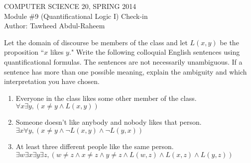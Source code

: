 \documentclass[12pt]{article}
\begin{document}
\begin{center}
COMPUTER SCIENCE 20, SPRING 2014 \\
Module \#9 (Quantificational Logic I) Check-in \\
Author: Tawheed Abdul-Raheem
\end{center}

\medskip


Let the domain of discourse be members of the class and let $L(x,y)$ be the proposition ``$x$ likes $y$." Write the following colloquial English sentences using quantificational formulas. The sentences are not necessarily unambiguous. If a sentence has more than one possible meaning, explain the ambiguity and which interpretation you have chosen.

\begin{enumerate}

\item Everyone in the class likes some other member of the class. \\
    $\forall x \exists y, (x \not = y \wedge L(x,y))$

\item Someone doesn't like anybody and nobody likes that person. \\
    $\exists x \forall y, (x \not = y \wedge \neg L(x,y) \wedge \neg L(y,x))$

\item At least three different people like the same person. \\
    $\exists w \exists x \exists y \exists z, (w \neq z \wedge x \neq z \wedge y \neq z \wedge L(w,z) \wedge L(x,z) \wedge L(y,z))$

\end{enumerate}
\end{document}
